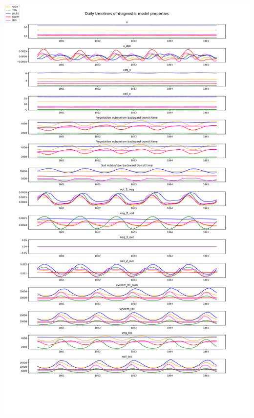 \documentclass[36pt]{article}
\begin{document}
\begin{tcbposter}
{\begin{multicols}{2}
\begin{center}
	\includegraphics[width=\columnwidth]{test.pdf}
\end{center}
\begin{center}

\end{center}
\end{multicols}}
\end{tcbposter}
\end{document}
